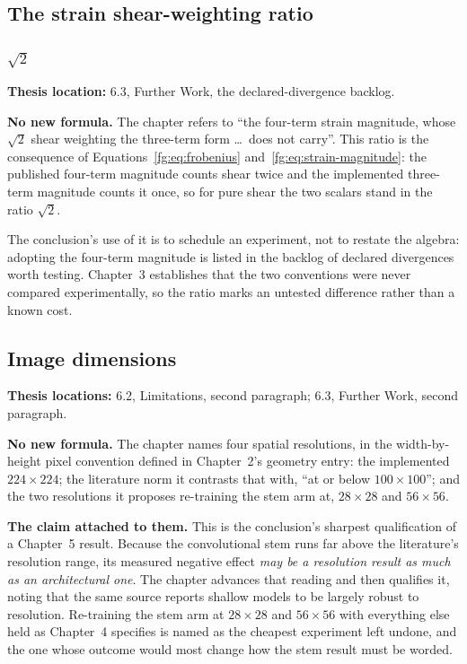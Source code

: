 \documentclass[11pt,a4paper]{article}
\numberwithin{equation}{section}
\begin{document}
\subsection{The strain shear-weighting ratio}

\subsubsection{\texorpdfstring{$\sqrt{2}$}{sqrt(2)}}
\label{fg6:sqrt2}
\textbf{Thesis location:} 6.3, Further Work, the declared-divergence backlog.

\textbf{No new formula.} The chapter refers to ``the four-term strain
magnitude, whose $\sqrt{2}$ shear weighting the three-term form \ldots\ does
not carry''. This ratio is the consequence of Equations~\eqref{fg:eq:frobenius}
and~\eqref{fg:eq:strain-magnitude}: the published four-term magnitude counts shear twice and the
implemented three-term magnitude counts it once, so for pure shear the two
scalars stand in the ratio $\sqrt{2}$.

The conclusion's use of it is to schedule an experiment, not to restate the
algebra: adopting the four-term magnitude is listed in the backlog of declared
divergences worth testing. Chapter~3 establishes that the two conventions were
never compared experimentally, so the ratio marks an untested difference
rather than a known cost.

\subsection{Image dimensions}
\label{fg6:dimensions}
\textbf{Thesis locations:} 6.2, Limitations, second paragraph; 6.3, Further
Work, second paragraph.

\textbf{No new formula.} The chapter names four spatial resolutions, in the
width-by-height pixel convention defined in Chapter~2's geometry entry:
the implemented $224 \times 224$; the literature norm it contrasts that with,
``at or below $100 \times 100$''; and the two resolutions it proposes
re-training the stem arm at, $28 \times 28$ and $56 \times 56$.

\textbf{The claim attached to them.} This is the conclusion's sharpest
qualification of a Chapter~5 result. Because the convolutional stem runs far
above the literature's resolution range, its measured negative effect
\emph{may be a resolution result as much as an architectural one}. The chapter
advances that reading and then qualifies it, noting that the same source
reports shallow models to be largely robust to resolution. Re-training the
stem arm at $28 \times 28$ and $56 \times 56$ with everything else held as
Chapter~4 specifies is named as the cheapest experiment left undone, and the
one whose outcome would most change how the stem result must be worded.
\end{document}
